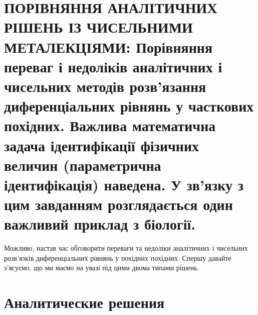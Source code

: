 \documentclass[
  ukrainian,
]{article}
\begin{document}
\section{ПОРІВНЯННЯ АНАЛІТИЧНИХ РІШЕНЬ ІЗ ЧИСЕЛЬНИМИ МЕТАЛЕКЦІЯМИ:
Порівняння переваг і недоліків аналітичних і чисельних методів
розв'язання диференціальних рівнянь у часткових похідних. Важлива
математична задача ідентифікації фізичних величин (параметрична
ідентифікація) наведена. У зв'язку з цим завданням розглядається один
важливий приклад з
біології.}\label{ux43fux43eux440ux456ux432ux43dux44fux43dux43dux44f-ux430ux43dux430ux43bux456ux442ux438ux447ux43dux438ux445-ux440ux456ux448ux435ux43dux44c-ux456ux437-ux447ux438ux441ux435ux43bux44cux43dux438ux43cux438-ux43cux435ux442ux430ux43bux435ux43aux446ux456ux44fux43cux438-ux43fux43eux440ux456ux432ux43dux44fux43dux43dux44f-ux43fux435ux440ux435ux432ux430ux433-ux456-ux43dux435ux434ux43eux43bux456ux43aux456ux432-ux430ux43dux430ux43bux456ux442ux438ux447ux43dux438ux445-ux456-ux447ux438ux441ux435ux43bux44cux43dux438ux445-ux43cux435ux442ux43eux434ux456ux432-ux440ux43eux437ux432ux44fux437ux430ux43dux43dux44f-ux434ux438ux444ux435ux440ux435ux43dux446ux456ux430ux43bux44cux43dux438ux445-ux440ux456ux432ux43dux44fux43dux44c-ux443-ux447ux430ux441ux442ux43aux43eux432ux438ux445-ux43fux43eux445ux456ux434ux43dux438ux445.-ux432ux430ux436ux43bux438ux432ux430-ux43cux430ux442ux435ux43cux430ux442ux438ux447ux43dux430-ux437ux430ux434ux430ux447ux430-ux456ux434ux435ux43dux442ux438ux444ux456ux43aux430ux446ux456ux457-ux444ux456ux437ux438ux447ux43dux438ux445-ux432ux435ux43bux438ux447ux438ux43d-ux43fux430ux440ux430ux43cux435ux442ux440ux438ux447ux43dux430-ux456ux434ux435ux43dux442ux438ux444ux456ux43aux430ux446ux456ux44f-ux43dux430ux432ux435ux434ux435ux43dux430.-ux443-ux437ux432ux44fux437ux43aux443-ux437-ux446ux438ux43c-ux437ux430ux432ux434ux430ux43dux43dux44fux43c-ux440ux43eux437ux433ux43bux44fux434ux430ux454ux442ux44cux441ux44f-ux43eux434ux438ux43d-ux432ux430ux436ux43bux438ux432ux438ux439-ux43fux440ux438ux43aux43bux430ux434-ux437-ux431ux456ux43eux43bux43eux433ux456ux457.}

Можливо, настав час обговорити переваги та недоліки аналітичних і
чисельних розв'язків диференціальних рівнянь у похідних похідних. Спершу
давайте з'ясуємо, що ми маємо на увазі під цими двома типами рішень.

\section{Аналитические
решения}\label{ux430ux43dux430ux43bux438ux442ux438ux447ux435ux441ux43aux438ux435-ux440ux435ux448ux435ux43dux438ux44f}
\end{document}
